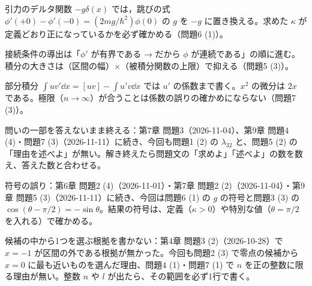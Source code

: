 \documentclass[uplatex,dvipdfmx,a4paper,11pt]{jsarticle}
\begin{document}
\matome
\begin{saitenichiran}
\end{saitenichiran}
\begin{daiji}
  \item 引力のデルタ関数 $-g\delta(x)$ では，跳びの式 $\phi'(+0)-\phi'(-0)=(2mg/\hbar^{2})\phi(0)$ の $g$ を $-g$ に置き換える。求めた $\kappa$ が定義どおり正になっているかを必ず確かめる（問題6 (1)）。
  \item 接続条件の導出は「$\phi'$ が有界である → だから $\phi$ が連続である」の順に進む。積分の大きさは（区間の幅）$\times$（被積分関数の上限）で抑える（問題5 (3)）。
  \item 部分積分 $\int uv'\dd x=[uv]-\int u'v\dd x$ では $u'$ の係数まで書く。$x^{2}$ の微分は $2x$ である。極限（$n\to\infty$）が合うことは係数の誤りの確かめにならない（問題7 (3)）。
\end{daiji}
\begin{maemo}
  \item 問いの一部を答えないまま終える：第7章 問題3（2026-11-04）、第9章 問題4 (4)・問題7 (3)（2026-11-11）に続き、今回も問題1 (2) の $\lambda_{32}$ と、問題5 (2) の「理由を述べよ」が無い。解き終えたら問題文の「求めよ」「述べよ」の数を数え、答えた数と合わせる。
  \item 符号の誤り：第6章 問題2 (4)（2026-11-01）・第7章 問題2 (2)（2026-11-04）・第9章 問題5 (3)（2026-11-11）に続き、今回は問題6 (1) の $g$ の符号と問題3 (3) の $\cos(\theta-\pi/2)=-\sin\theta$。結果の符号は、定義（$\kappa>0$）や特別な値（$\theta=\pi/2$ を入れる）で確かめる。
  \item 候補の中から1つを選ぶ根拠を書かない：第4章 問題3 (2)（2026-10-28）で $x=-1$ が区間の外である根拠が無かった。今回も問題2 (3) で零点の候補から $x=0$ に最も近いものを選んだ理由、問題4 (1)・問題7 (1) で $n$ を正の整数に限る理由が無い。整数 $n$ や $l$ が出たら、その範囲を必ず1行で書く。
\end{maemo}
\end{document}
